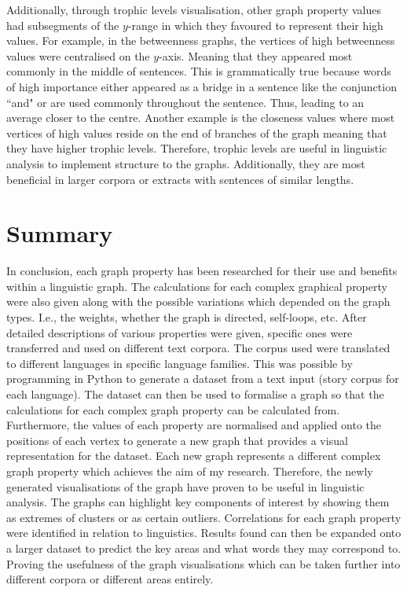 Additionally, through trophic levels visualisation, other graph property values had subsegments of the $y$-range in which they favoured to represent their high values. For example, in the betweenness graphs, the vertices of high betweenness values were centralised on the $y$-axis. Meaning that they appeared most commonly in the middle of sentences. This is grammatically true because words of high importance either appeared as a bridge in a sentence like the conjunction ``and" or are used commonly throughout the sentence. Thus, leading to an average closer to the centre. Another example is the closeness values where most vertices of high values reside on the end of branches of the graph meaning that they have higher trophic levels. Therefore, trophic levels are useful in linguistic analysis to implement structure to the graphs. Additionally, they are most beneficial in larger corpora or extracts with sentences of similar lengths.

\section{Summary}
In conclusion, each graph property has been researched for their use and benefits within a linguistic graph. The calculations for each complex graphical property were also given along with the possible variations which depended on the graph types. I.e., the weights, whether the graph is directed, self-loops, etc. After detailed descriptions of various properties were given, specific ones were transferred and used on different text corpora. The corpus used were translated to different languages in specific language families. This was possible by programming in Python to generate a dataset from a text input (story corpus for each language). The dataset can then be used to formalise a graph so that the calculations for each complex graph property can be calculated from. Furthermore, the values of each property are normalised and applied onto the positions of each vertex to generate a new graph that provides a visual representation for the dataset. Each new graph represents a different complex graph property which achieves the aim of my research. Therefore, the newly generated visualisations of the graph have proven to be useful in linguistic analysis. The graphs can highlight key components of interest by showing them as extremes of clusters or as certain outliers. Correlations for each graph property were identified in relation to linguistics. Results found can then be expanded onto a larger dataset to predict the key areas and what words they may correspond to. Proving the usefulness of the graph visualisations which can be taken further into different corpora or different areas entirely.

